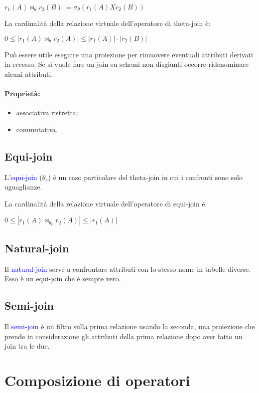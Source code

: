 $r_1(A) \bowtie_\theta r_2(B) := \sigma_\theta ( r_1(A) X r_2(B) )$

La cardinalità della relazione virtuale dell'operatore di theta-join è:

$0 \leq |r_1(A) \bowtie_\theta r_2(A)| \leq |r_1(A)| \cdot |r_2(B)|$

Può essere utile eseguire una proiezione per rimuovere eventuali attributi derivati in eccesso. Se si vuole fare un join su schemi non disgiunti occorre ridenominare alcuni attributi.

\paragraph{Proprietà:} 
\begin{itemize}
    \item associativa ristretta;
    \item commutativa.
\end{itemize}

\subsection{Equi-join}

L'\textcolor{blue}{equi-join} ($\theta_e$) è un caso particolare del theta-join in cui i confronti sono solo uguaglianze.

La cardinalità della relazione virtuale dell'operatore di equi-join è:

$0 \leq |r_1(A) \bowtie_{\theta_e} r_2(A)| \leq |r_1(A)|$

\subsection{Natural-join}

Il \textcolor{blue}{natural-join} serve a confrontare attributi con lo stesso nome in tabelle diverse. Esso è un equi-join che è sempre vero.

\subsection{Semi-join} 

Il \textcolor{blue}{semi-join} è un filtro sulla prima relazione usando la seconda, una proiezione che prende in considerazione gli attributi della prima relazione dopo aver fatto un join tra le due.

\section{Composizione di operatori}

